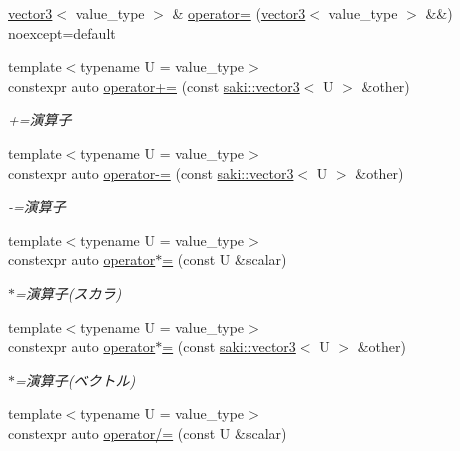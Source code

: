 \begin{DoxyCompactItemize}
\item 
\mbox{\hyperlink{classsaki_1_1vector3}{vector3}}$<$ value\+\_\+type $>$ \& \mbox{\hyperlink{classsaki_1_1vector3_a3040b68e9d396eac595c655a8cb00c3b}{operator=}} (\mbox{\hyperlink{classsaki_1_1vector3}{vector3}}$<$ value\+\_\+type $>$ \&\&) noexcept=default
\item 
{\footnotesize template$<$typename U  = value\+\_\+type$>$ }\\constexpr auto \mbox{\hyperlink{classsaki_1_1vector3_a43154ea2ea8a46b43e1bd7d6afe9dd09}{operator+=}} (const \mbox{\hyperlink{classsaki_1_1vector3}{saki\+::vector3}}$<$ U $>$ \&other)
\begin{DoxyCompactList}\small\item\em +=演算子 \end{DoxyCompactList}\item 
{\footnotesize template$<$typename U  = value\+\_\+type$>$ }\\constexpr auto \mbox{\hyperlink{classsaki_1_1vector3_ad52d6e5aff4f4c1575f9f4ee07730eff}{operator-\/=}} (const \mbox{\hyperlink{classsaki_1_1vector3}{saki\+::vector3}}$<$ U $>$ \&other)
\begin{DoxyCompactList}\small\item\em -\/=演算子 \end{DoxyCompactList}\item 
{\footnotesize template$<$typename U  = value\+\_\+type$>$ }\\constexpr auto \mbox{\hyperlink{classsaki_1_1vector3_a4318c169c217b1b35b3d79ee53d767f5}{operator$\ast$=}} (const U \&scalar)
\begin{DoxyCompactList}\small\item\em $\ast$=演算子(スカラ) \end{DoxyCompactList}\item 
{\footnotesize template$<$typename U  = value\+\_\+type$>$ }\\constexpr auto \mbox{\hyperlink{classsaki_1_1vector3_acb87d334559aa5e1da12e680193eba84}{operator$\ast$=}} (const \mbox{\hyperlink{classsaki_1_1vector3}{saki\+::vector3}}$<$ U $>$ \&other)
\begin{DoxyCompactList}\small\item\em $\ast$=演算子(ベクトル) \end{DoxyCompactList}\item 
{\footnotesize template$<$typename U  = value\+\_\+type$>$ }\\constexpr auto \mbox{\hyperlink{classsaki_1_1vector3_aada96ea6099dc050f89bc0fead1706ca}{operator/=}} (const U \&scalar)

\end{DoxyCompactItemize}
